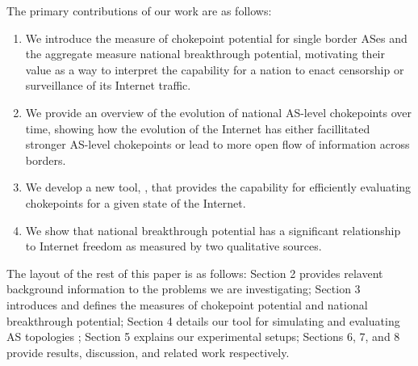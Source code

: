 \par
The primary contributions of our work are as follows: 
\begin{enumerate}
 \item We introduce the measure of chokepoint potential for single border ASes and the aggregate measure national breakthrough potential, 
motivating their value as a way to interpret the capability for a nation to enact censorship or surveillance of its Internet traffic.
 \item We provide an overview of the evolution of national AS-level chokepoints over time, showing how the evolution of the Internet has either facillitated stronger
 AS-level chokepoints or lead to more open flow of information across borders.
 \item We develop a new tool, \toolname{}, that provides the capability for
efficiently evaluating chokepoints for a given state of the Internet. 
 \item We show that national breakthrough potential
has a significant relationship to Internet freedom as measured by two qualitative sources.
\end{enumerate}


\par
The layout of the rest of this paper is as follows: Section 2 provides relavent background information
to the problems we are investigating; Section 3 introduces and defines the measures of chokepoint
potential and national breakthrough potential; Section 4 details our tool for simulating and evaluating AS topologies \toolname{}; Section 5
explains our experimental setups; Sections 6, 7, and 8 provide results, discussion, and related work
respectively.
